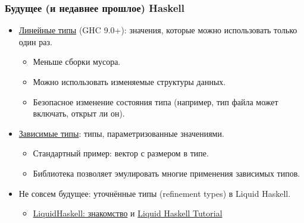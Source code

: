 \documentclass[11pt]{beamer}
\begin{document}
\begin{frame}[fragile]
  \frametitle{Будущее (и недавнее прошлое) Haskell}
  \begin{itemize}
    \item \href{https://downloads.haskell.org/~ghc/latest/docs/html/users_guide/exts/linear_types.html}{Линейные типы} (GHC 9.0+): значения, которые можно использовать только один раз.
          \begin{itemize}
            \item Меньше сборки мусора.
            \item Можно использовать изменяемые структуры данных.
            \item Безопасное изменение состояния типа (например, тип файла может включать, открыт ли он).
          \end{itemize}
          \pause
    \item \href{https://serokell.io/blog/2018/12/17/why-dependent-haskell}{Зависимые типы}: типы, параметризованные значениями.
          \begin{itemize}
            \item Стандартный пример: вектор с размером в типе.
            \item Библиотека  позволяет эмулировать многие применения зависимых типов.
          \end{itemize}
          \pause
    \item Не совсем будущее: уточнённые типы (refinement types) в Liquid Haskell.
          \begin{itemize}
            \item \href{https://ruhaskell.org/posts/utils/2016/12/16/liquidhaskell-hello.html}{LiquidHaskell: знакомство} и \href{https://liquid.kosmikus.org/}{Liquid Haskell Tutorial}
          \end{itemize}
  \end{itemize}
\end{frame}
\end{document}
